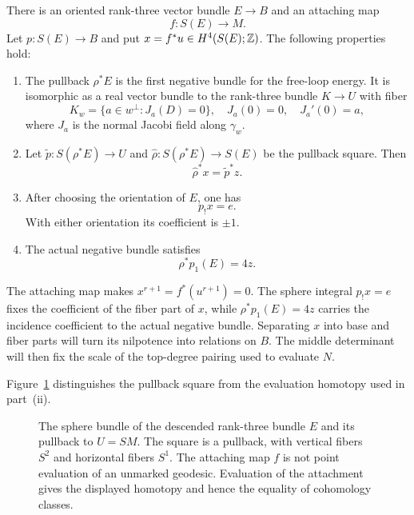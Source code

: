 \begin{proposition}
\label{geo:attachment}
There is an oriented rank-three vector bundle $E\to B$ and an
attaching map
\[
 f:S(E)\longrightarrow M.
\]
Let $p:S(E)\to B$ and put $x=f^*u\in H^4(S(E);\mathbb Z)$.
The following properties hold:
\begin{enumerate}[label=\textup{(\roman*)}]
\item The pullback $\rho^*E$ is the first negative bundle for the
      free-loop energy.  It is isomorphic as a real vector bundle
      to the rank-three bundle $K\to U$ with fiber
      \[
       K_w=\{a\in w^\perp:
          J_a(D)=0\},
       \quad J_a(0)=0,\quad J_a'(0)=a,
      \]
      where $J_a$ is the normal Jacobi field along $\gamma_w$.
\item Let $\widetilde p:S(\rho^*E)\to U$ and
      $\widehat\rho:S(\rho^*E)\to S(E)$ be the pullback square.
      Then
      \begin{equation}\label{geo:attachment-pullback}
       \widehat\rho^*x=\widetilde p^*z.
      \end{equation}
\item After choosing the orientation of $E$, one has
      \begin{equation}\label{geo:primitive-boundary}
       p_!x=e.
      \end{equation}
      With either orientation its coefficient is $\pm1$.
\item The actual negative bundle satisfies
      \begin{equation}\label{geo:negative-pontryagin}
       \rho^*p_1(E)=4z.
      \end{equation}
\end{enumerate}
\end{proposition}

The attaching map makes $x^{r+1}=f^*(u^{r+1})=0$.
The sphere integral $p_!x=e$ fixes the coefficient of the fiber
part of $x$, while $\rho^*p_1(E)=4z$ carries the incidence
coefficient to the actual negative bundle.  Separating $x$ into
base and fiber parts will turn its nilpotence into relations on
$B$.  The middle determinant will then fix the scale of the
top-degree pairing used to evaluate $N$.

Figure~\ref{fig:attachment-pullback} distinguishes the pullback
square from the evaluation homotopy used in part~\textup{(ii)}.
\begin{figure}[tbp]
\centering

\caption{The sphere bundle of the descended rank-three bundle $E$
and its pullback to $U=SM$. The square is a pullback, with vertical fibers
$S^2$ and horizontal fibers $S^1$. The attaching map $f$ is not
point evaluation of an unmarked geodesic. Evaluation of the
attachment gives the displayed homotopy and hence the equality
of cohomology classes.}
\label{fig:attachment-pullback}
\end{figure}

